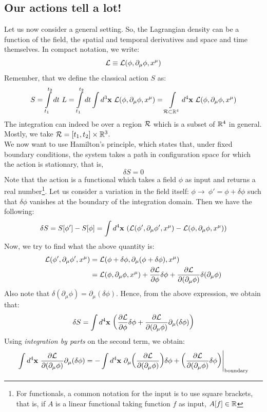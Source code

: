 \subsection{Our actions tell a lot!}
Let us now consider a general setting. So, the Lagrangian density can be a function of the field, the spatial and temporal derivatives and space and time themselves. In compact notation, we write:
$$\mathcal L \equiv \mathcal L(\phi, \partial_\mu \phi, x^\mu)$$
Remember, that we define the classical action $S$ as:
$$S = \int\limits_{t_1}^{t_2} dt \ L = \int\limits_{t_1}^{t_2} dt \int d^3\vb{x}\ \mathcal L(\phi, \partial_\mu \phi, x^\mu) = \int\limits_{\mathcal R\subset \mathbb{R}^4} d^4\vb{x} \ \mathcal L(\phi, \partial_\mu \phi, x^\mu)$$
The integration can indeed be over a region $\mathcal R$ which is a subset of $\mathbb{R}^4$ in general. Mostly, we take $\mathcal R = [t_1,t_2]\times \mathbb{R}^3$.\\[0.2cm]
 We now want to use Hamilton's principle, which states that, under fixed boundary conditions, the system takes a path in configuration space for which the action is stationary, that is, 
$$\delta S =0$$
Note that the action is a functional which takes a field $\phi$ as input and returns a real number\footnote{For functionals, a common notation for the input is to use square brackets, that is, if $A$ is a linear functional taking function $f$ as input, $A[f]\in \mathbb{R}$}. Let us consider a variation in the field itself: $\phi \longrightarrow \ \phi' = \phi + \delta \phi$ such that $\delta\phi$ vanishes at the boundary of the integration domain.
Then we have the following:
$$\delta S = S[\phi'] - S[\phi] = \int d^4\vb{x}\ \qty(\mathcal L(\phi', \partial_\mu \phi', x^\mu) -\mathcal L(\phi, \partial_\mu \phi, x^\mu) )$$
Now, we try to find what the above quantity is:
\begin{align*}
    \mathcal L(\phi', \partial_\mu \phi', x^\mu) &= \mathcal L(\phi+\delta\phi, \partial_\mu (\phi+\delta \phi), x^\mu)\\
&=\mathcal L(\phi, \partial_\mu \phi, x^\mu) + \pdv{\mathcal L}{\phi}\delta\phi + \pdv{\mathcal L}{(\partial_\mu\phi)}\delta(\partial_\mu\phi)
\end{align*}
Also note that $\delta(\partial_\mu\phi) = \partial_\mu(\delta\phi)$. Hence, from the above expression, we obtain that:
$$\delta S = \int d^4\vb{x}\ \qty(\pdv{\SL}{\phi}\delta\phi + \pdv{\SL}{(\partial_\mu\phi)}\partial_\mu(\delta\phi))$$
Using \textit{integration by parts} on the second term, we obtain:
$$\int d^4\vb{x}\ \pdv{\SL}{(\partial_\mu\phi)}\partial_\mu(\delta\phi) = -\int d^4\vb{x}\ \partial_\mu\qty(\pdv{\SL}{(\partial_\mu\phi)})\delta\phi + \qty(\pdv{\SL}{(\partial_\mu\phi)}\delta\phi)\Biggr|_{\mathrm{boundary}}$$
